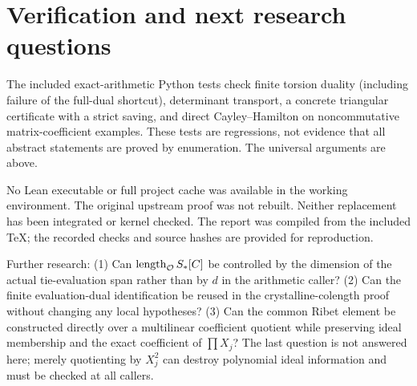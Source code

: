 \documentclass[11pt]{article}
\begin{document}
\section{Verification and next research questions}
The included exact-arithmetic Python tests check finite torsion duality (including failure of the full-dual shortcut), determinant transport, a concrete triangular certificate with a strict saving, and direct Cayley--Hamilton on noncommutative matrix-coefficient examples. These tests are regressions, not evidence that all abstract statements are proved by enumeration. The universal arguments are above.

No Lean executable or full project cache was available in the working environment. The original upstream proof was not rebuilt. Neither replacement has been integrated or kernel checked. The report was compiled from the included TeX; the recorded checks and source hashes are provided for reproduction.

Further research: (1) Can $\operatorname{length}_{\mathcal O} S_*[C]$ be controlled by the dimension of the actual tie-evaluation span rather than by $d$ in the arithmetic caller? (2) Can the finite evaluation-dual identification be reused in the crystalline-colength proof without changing any local hypotheses? (3) Can the common Ribet element be constructed directly over a multilinear coefficient quotient while preserving ideal membership and the exact coefficient of $\prod X_j$? The last question is not answered here; merely quotienting by $X_j^2$ can destroy polynomial ideal information and must be checked at all callers.
\end{document}
